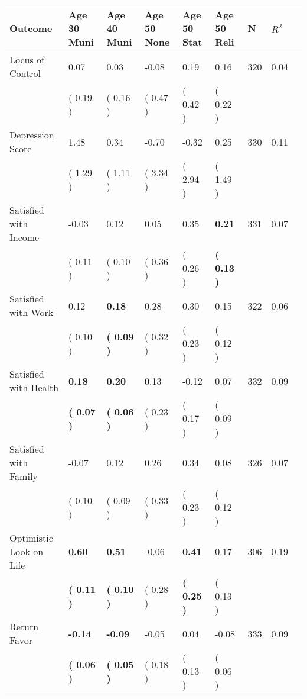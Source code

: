 \begin{tabular}{L{6.2cm} C{1.8cm} C{1.8cm} C{1.8cm} C{1.8cm} C{1.8cm} C{1.8cm} C{0.3cm} C{0.3cm}}
\toprule
 \textbf{Outcome} & \textbf{Age 30 Muni} & \textbf{Age 40 Muni} & \textbf{Age 50 None} & \textbf{Age 50 Stat} & \textbf{Age 50 Reli} & \textbf{N} & \textbf{$ R^2$} \\
\midrule
Locus of Control &      0.07 &      0.03 &     -0.08 &      0.19 &      0.16  & 320 &       0.04 \\ 
 & (     0.19 ) & (     0.16 ) & (     0.47 ) & (     0.42 ) & (     0.22 )  & \\
Depression Score &      1.48 &      0.34 &     -0.70 &     -0.32 &      0.25  & 330 &       0.11 \\ 
 & (     1.29 ) & (     1.11 ) & (     3.34 ) & (     2.94 ) & (     1.49 )  & \\
Satisfied with Income &     -0.03 &      0.12 &      0.05 &      0.35 & \textbf{     0.21}  & 331 &       0.07 \\ 
 & (     0.11 ) & (     0.10 ) & (     0.36 ) & (     0.26 ) & \textbf{(     0.13 )}  & \\
Satisfied with Work &      0.12 & \textbf{     0.18} &      0.28 &      0.30 &      0.15  & 322 &       0.06 \\ 
 & (     0.10 ) & \textbf{(     0.09 )} & (     0.32 ) & (     0.23 ) & (     0.12 )  & \\
Satisfied with Health & \textbf{     0.18} & \textbf{     0.20} &      0.13 &     -0.12 &      0.07  & 332 &       0.09 \\ 
 & \textbf{(     0.07 )} & \textbf{(     0.06 )} & (     0.23 ) & (     0.17 ) & (     0.09 )  & \\
Satisfied with Family &     -0.07 &      0.12 &      0.26 &      0.34 &      0.08  & 326 &       0.07 \\ 
 & (     0.10 ) & (     0.09 ) & (     0.33 ) & (     0.23 ) & (     0.12 )  & \\
Optimistic Look on Life & \textbf{     0.60} & \textbf{     0.51} &     -0.06 & \textbf{     0.41} &      0.17  & 306 &       0.19 \\ 
 & \textbf{(     0.11 )} & \textbf{(     0.10 )} & (     0.28 ) & \textbf{(     0.25 )} & (     0.13 )  & \\
Return Favor & \textbf{    -0.14} & \textbf{    -0.09} &     -0.05 &      0.04 &     -0.08  & 333 &       0.09 \\ 
 & \textbf{(     0.06 )} & \textbf{(     0.05 )} & (     0.18 ) & (     0.13 ) & (     0.06 )  & \\

\end{tabular}
